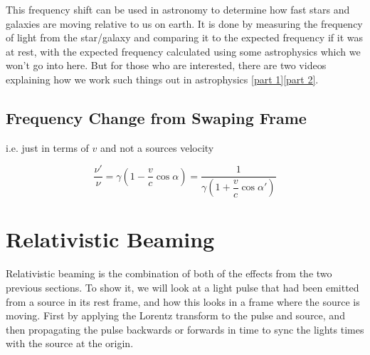 This frequency shift can be used in astronomy to determine how fast stars and galaxies are moving relative to us on earth.
It is done by measuring the frequency of light from the star/galaxy and comparing it to the expected frequency if it was at rest, with the expected frequency calculated using some astrophysics which we won't go into here.
But for those who are interested, there are two videos explaining how we work such things out in astrophysics \href{https://www.youtube.com/watch?v=YdOXS_9_P4U}{[part 1]}\href{https://www.youtube.com/watch?v=hFMaT9oRbs4}{[part 2]}.

\subsection{Frequency Change from Swaping Frame}\label{subsect: Frequency Change from Swaping Frame}

i.e. just in terms of $v$ and not a sources velocity

\begin{equation}
	\frac{\nu'}{\nu} = {\gamma} \left(1-\dfrac{v}{c} \cos\alpha \right)  = \frac{1}{ {\gamma} \left(1+\dfrac{v}{c} \cos\alpha' \right)}
\end{equation}


\section{Relativistic Beaming} \label{sect: Relativistic Beaming}

Relativistic beaming is the combination of both of the effects from the two previous sections.
To show it, we will look at a light pulse that had been emitted from a source in its rest frame, and how this looks in a frame where the source is moving.
First by applying the Lorentz transform to the pulse and source, and then propagating the pulse backwards or forwards in time to sync the lights times with the source at the origin.

